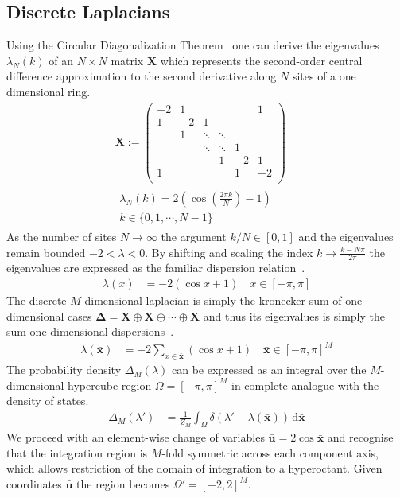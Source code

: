 \documentclass{article}[12pt]
\numberwithin{equation}{section}
\begin{document}
\subsection{Discrete Laplacians}
Using the Circular Diagonalization Theorem~\cite{} one can derive the
eigenvalues $\lambda_N(k)$ of an $N\times N$ matrix $\mathbf X$ which
represents the second-order central difference approximation to the
second derivative along $N$ sites of a one dimensional ring.
\begin{align}
  \mathbf X :=
  \begin{pmatrix}
    -2 & 1 &  &  &  & 1 \\
    1 & -2 & 1 &  &  &  \\
    & 1 & \ddots & \ddots &  & \\
    & & \ddots & \ddots & 1 & \\
    & & & 1 & -2 & 1 \\
    1 & & & & 1 & -2 \\
  \end{pmatrix}\\
  \begin{matrix}
    \lambda_N(k)=2\left(\cos\left(\frac{2\pi k}{N}\right)-1\right) \\
    k\in\{0,1,\cdots,N-1\}
  \end{matrix}
  \qquad
\end{align}
As the number of sites $N\rightarrow\infty$ the argument $k/N\in[0,1]$
and the eigenvalues remain bounded $-2<\lambda<0$. By shifting and scaling
the index $k\rightarrow\frac{k-N\pi}{2\pi}$ the eigenvalues are expressed as
the familiar dispersion relation~\cite{}.
\begin{align}
  \lambda(x)&=
  -2\left(\cos x+1\right)
  \quad x\in[-\pi,\pi]
\end{align}
The discrete $M$-dimensional laplacian is simply the kronecker sum of one
dimensional cases $\mathbf\Delta=\mathbf X\oplus\mathbf X\oplus\cdots\oplus\mathbf X$
and thus its eigenvalues is simply the sum one dimensional dispersions~\cite{}.
\begin{align}
  \lambda(\bar{\mathbf{x}})&=
  -2\sum_{x\in\bar{\mathbf{x}}}\left(\cos x+1\right)
  \quad \bar{\mathbf{x}}\in[-\pi,\pi]^M
\end{align}
The probability density $\Delta_M(\lambda)$ can be expressed as an integral
over the $M$-dimensional hypercube region $\Omega=[-\pi,\pi]^M$ in complete
analogue with the density of states.
\begin{align}
  \Delta_M(\lambda')&=\frac{1}{Z_M}\int_{\Omega}\!\delta(\lambda'-\lambda(\bar{\mathbf{x}}))\,\mathrm{d}\bar{\mathbf{x}}
\end{align}
We proceed with an element-wise change of variables $\bar{\mathbf{u}}=2\cos \bar{\mathbf{x}}$ and
recognise that the integration region is $M$-fold symmetric across each
component axis, which allows restriction of the domain of integration to a
hyperoctant. Given coordinates $\bar{\mathbf{u}}$ the region becomes $\Omega'=[-2,2]^M$.
\end{document}
